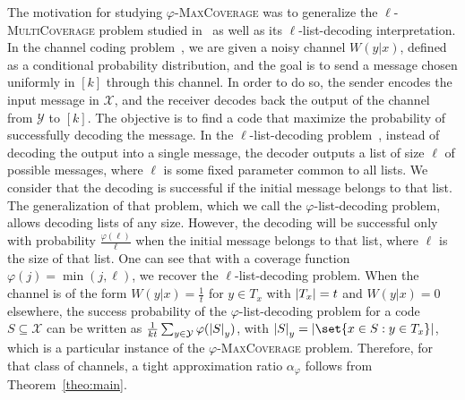 The motivation for studying $\varphi$-\textsc{MaxCoverage} was to generalize the $\ell$-\textsc{MultiCoverage} problem studied in~\cite{BFGG20} as well as its $\ell$-list-decoding interpretation. In the channel coding problem~\cite{BF18}, we are given a noisy channel $W(y|x)$, defined as a conditional probability distribution, and the goal is to send a message chosen uniformly in $[k]$ through this channel. In order to do so, the sender encodes the input message in $\mathcal{X}$, and the receiver decodes back the output of the channel from $\mathcal{Y}$ to $[k]$. The objective is to find a code that maximize the probability of successfully decoding the message. In the $\ell$-list-decoding problem~\cite{Elias57,Wozencraft58}, instead of decoding the output into a single message, the decoder outputs a list of size $\ell$ of possible messages, where $\ell$ is some fixed parameter common to all lists. We consider that the decoding is successful if the initial message belongs to that list. The generalization of that problem, which we call the $\varphi$-list-decoding problem, allows decoding lists of any size.  However, the decoding will be successful only with probability $\frac{\varphi(\ell)}{\ell}$ when the initial message belongs to that list, where $\ell$ is the size of that list. One can see that with a coverage function $\varphi(j) = \min(j,\ell)$, we recover the $\ell$-list-decoding problem. When the channel is of the form $W(y|x) = \frac{1}{t}$ for $y \in T_x$ with $\abs{T_x}=t$ and $W(y|x) = 0$ elsewhere, the success probability of the $\varphi$-list-decoding problem for a code $S\subseteq \mathcal{X}$ can be written as $\frac{1}{kt}\sum_{y \in \mathcal{Y}}\varphi(\abs{S}_y)$, with $\abs{S}_y = \abs{\set{x \in S : y \in T_x}}$, which is a particular instance of the $\varphi$-\textsc{MaxCoverage} problem. Therefore, for that class of channels, a tight approximation ratio $\alpha_{\varphi}$ follows from Theorem~\ref{theo:main}.

